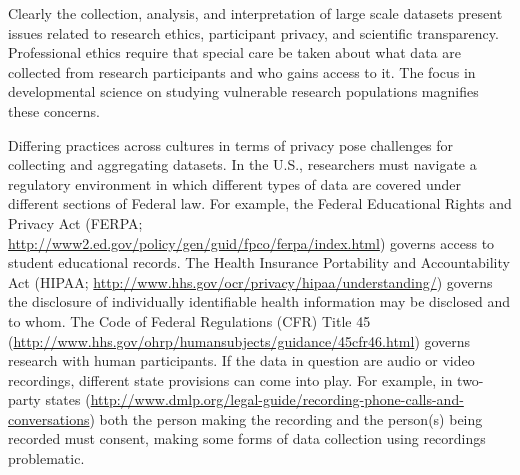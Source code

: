 \documentclass[letterpaper,man,apacite,natbib]{apa6}
\begin{document}
Clearly the collection, analysis, and interpretation of large scale datasets present issues related to research ethics, participant privacy, and scientific transparency.
Professional ethics require that special care be taken about what data are collected from research participants and who gains access to it.
The focus in developmental science on studying vulnerable research populations magnifies these concerns.

Differing practices across cultures in terms of privacy pose challenges for collecting and aggregating datasets.
In the U.S., researchers must navigate a regulatory environment in which different types of data are covered under different sections of Federal law.
For example, the Federal Educational Rights and Privacy Act (FERPA; \url{http://www2.ed.gov/policy/gen/guid/fpco/ferpa/index.html}) governs access to student educational records.
The Health Insurance Portability and Accountability Act (HIPAA; \url{http://www.hhs.gov/ocr/privacy/hipaa/understanding/}) governs the disclosure of individually identifiable health information may be disclosed and to whom.
The Code of Federal Regulations (CFR) Title 45 (\url{http://www.hhs.gov/ohrp/humansubjects/guidance/45cfr46.html}) governs research with human participants.
If the data in question are audio or video recordings, different state provisions can come into play.
For example, in two-party states (\url{http://www.dmlp.org/legal-guide/recording-phone-calls-and-conversations}) both the person making the recording and the person(s) being recorded must consent, making some forms of data collection using recordings problematic.
\end{document}
